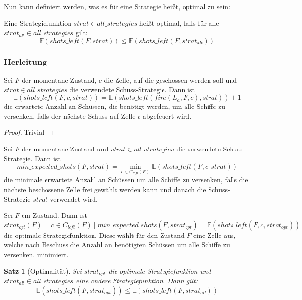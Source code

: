 \documentclass[a4paper,12pt]{llncs}
\numberwithin{equation}{section}
\newtheorem{satz}{Satz}
\begin{document}
Nun kann definiert werden, was es für eine Strategie heißt, optimal zu sein:
\begin{definition}
Eine Strategiefunktion $strat \in all\_strategies$ heißt optimal, falls für alle $strat_{alt} \in all\_strategies$ gilt:
\[
\mathds{E}(shots\_left(F, strat)) \leq \mathds{E}(shots\_left(F, strat_{alt}))
\]
\end{definition}

\subsubsection{Herleitung}

\begin{lemma}
Sei $F$ der momentane Zustand, $c$ die Zelle, auf die geschossen werden soll und $strat \in all\_strategies$ die verwendete Schuss-Strategie.
Dann ist
\[
\mathds{E}(shots\_left(F, c, strat))=\mathds{E}(shots\_left(fire(L_a, F, c), strat)) + 1
\]
die erwartete Anzahl an Schüssen, die benötigt werden, um alle Schiffe zu versenken, falls der nächste Schuss auf Zelle $c$ abgefeuert wird.
\end{lemma}

\begin{proof}
Trivial
\end{proof}

\begin{definition}
Sei $F$ der momentane Zustand und $strat \in all\_strategies$ die verwendete Schuss-Strategie.
Dann ist
\[
min\_expected\_shots(F, strat)=\min_{c \in C_{left}(F)} \mathds{E}(shots\_left(F, c, strat))
\]
die minimale erwartete Anzahl an Schüssen um alle Schiffe zu versenken, falls die nächste beschossene Zelle frei gewählt werden kann und danach die Schuss-Strategie $strat$ verwendet wird.
\end{definition}

\begin{definition}
Sei $F$ ein Zustand.
Dann ist
\[
strat_{opt}(F)=c \in C_{left}(F) \mid min\_expected\_shots(F, strat_{opt})= \mathds{E}(shots\_left(F, c, strat_{opt}))
\]
die optimale Strategiefunktion.
Diese wählt für den Zustand $F$ eine Zelle aus, welche nach Beschuss die Anzahl an benötigten Schüssen um alle Schiffe zu versenken, minimiert.
\end{definition}

\begin{satz}[Optimalität]
Sei $strat_{opt}$ die optimale Strategiefunktion und $strat_{alt} \in all\_strategies$ eine andere Strategiefunktion.
Dann gilt:
\[
\mathds{E}(shots\_left(F, strat_{opt})) \leq \mathds{E}(shots\_left(F, strat_{alt}))
\]
\end{satz}
\end{document}
